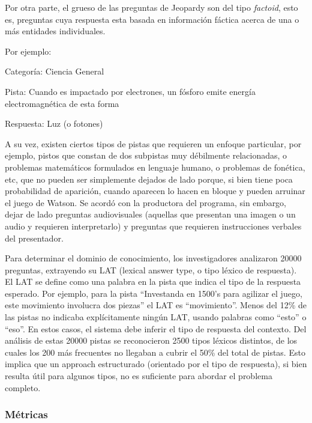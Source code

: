 Por otra parte, el grueso de las preguntas de Jeopardy son del tipo
\textit{factoid}, esto es, preguntas cuya respuesta esta basada en
información fáctica acerca de una o más entidades individuales.


\bigskip

Por ejemplo:

Categoría: Ciencia General

Pista: Cuando es impactado por electrones, un fósforo emite energía
electromagnética de esta forma

Respuesta: Luz (o fotones)


\bigskip

A su vez, existen ciertos tipos de pistas que requieren un enfoque
particular, por ejemplo, pistos que constan de dos subpistas muy
débilmente relacionadas, o problemas matemáticos formulados en
lenguaje humano, o problemas de fonética, etc, que no pueden ser
simplemente dejados de lado porque, si bien tiene poca probabilidad de
aparición, cuando aparecen lo hacen en bloque y pueden arruinar el
juego de Watson. Se acordó con la productora del programa, sin
embargo, dejar de lado preguntas audiovisuales (aquellas que presentan
una imagen o un audio y requieren interpretarlo) y preguntas que
requieren instrucciones verbales del presentador.


\bigskip

Para determinar el dominio de conocimiento, los investigadores
analizaron 20000 preguntas, extrayendo su LAT (lexical answer type, o
tipo léxico de respuesta). El LAT se define como una palabra en la
pista que indica el tipo de la respuesta esperado. Por ejemplo, para la
pista {\textquotedblleft}Investanda en 1500{\textquoteright}s para
agilizar el juego, este movimiento involucra dos
piezas{\textquotedblright} el LAT es
{\textquotedblleft}movimiento{\textquotedblright}. Menos del 12\% de
las pistas no indicaba explícitamente ningún LAT, usando palabras
como {\textquotedblleft}esto{\textquotedblright} o
{\textquotedblleft}eso{\textquotedblright}. En estos casos, el sistema
debe inferir el tipo de respuesta del contexto. Del análisis de estas
20000 pistas se reconocieron 2500 tipos léxicos distintos, de los
cuales los 200 más frecuentes no llegaban a cubrir el 50\% del total
de pistas. Esto implica que un approach estructurado (orientado por el
tipo de respuesta), si bien resulta útil para algunos tipos, no es
suficiente para abordar el problema completo.

\subsubsection*{Métricas}

